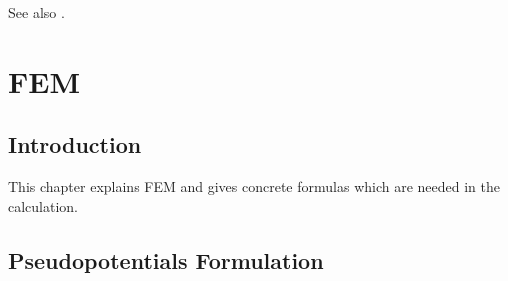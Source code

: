 See also \cite{blochl}.

\section{FEM}

\subsection{Introduction}

This chapter explains FEM and gives concrete formulas which are needed in the calculation.

\subsection{Pseudopotentials Formulation}


